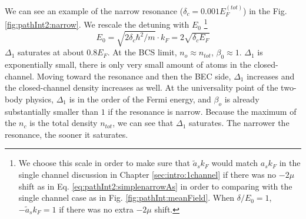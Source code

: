We can see an example of the narrow resonance ($\delta_{c}=0.001E_{F}^{(tot)}$) in the Fig. \ref{fig:pathInt2:narrow}. We rescale the detuning with $E_{0}$ \footnote{We choose this scale in order to make sure that $\tilde{a}_{s}k_{F}$ would match  $a_{s}k_{F}$ in the single channel discussion in Chapter \ref{sec:intro:1channel} if there was no $-2\mu$ shift as in Eq. \ref{eq:pathInt2:simplenarrowAs} in order to comparing with the single channel case as in Fig. \ref{fig:pathInt:meanField}.  When $\delta/E_{0}=1$, $-\tilde{a}_{s}k_{F}=1$ if there was no extra $-2\mu$ shift.}
\begin{equation}\label{eq:pathInt2:E0}
E_{0}=\sqrt{2\delta_{c}\hbar^{2}/m}\cdot{}k_{F}=2\sqrt{\delta_{c}E_{F}}
\end{equation}
$\Delta_{1}$ saturates at about $0.8E_{F}$. At the BCS limit, $n_{o}\approx{}n_{tot}$, $\beta_{0}\approx1$.  $\Delta_{1}$ is exponentially small, there is only very small amount of atoms in the closed-channel.  Moving toward the resonance and then the BEC side, $\Delta_{1}$ increases and the closed-channel density increases as well.  At the universality point of the two-body physics, $\Delta_{1}$ is in the order of the Fermi energy, and $\beta_{o}$ is already substantially smaller than $1$ if the resonance is narrow.  
Because the maximum of the $n_{c}$ is the total density $n_{tot}$, we can see that $\Delta_{1}$ saturates.  The narrower the resonance, the sooner it saturates.  

